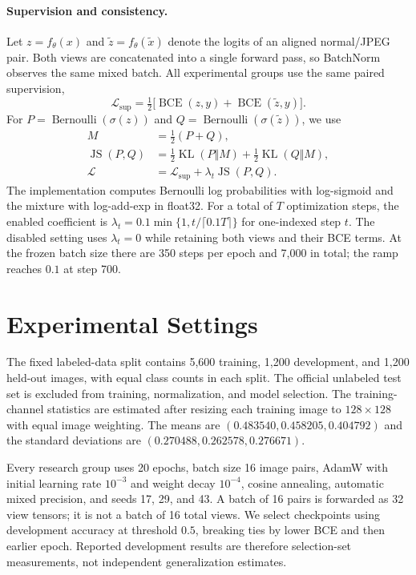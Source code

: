 \paragraph{Supervision and consistency.}
Let $z=f_\theta(x)$ and $\tilde z=f_\theta(\tilde x)$ denote the logits of an
aligned normal/JPEG pair. Both views are concatenated into a single forward
pass, so BatchNorm observes the same mixed batch. All experimental groups use
the same paired supervision,
\begin{equation}
 \mathcal L_{\mathrm{sup}}=\tfrac12\big[
 \operatorname{BCE}(z,y)+\operatorname{BCE}(\tilde z,y)\big].
\end{equation}
For $P=\operatorname{Bernoulli}(\sigma(z))$ and
$Q=\operatorname{Bernoulli}(\sigma(\tilde z))$, we use
\begin{align}
 M&=\tfrac12(P+Q),\\
 \operatorname{JS}(P,Q)&=\tfrac12\operatorname{KL}(P\Vert M)
                       +\tfrac12\operatorname{KL}(Q\Vert M),\\
 \mathcal L&=\mathcal L_{\mathrm{sup}}+\lambda_t\operatorname{JS}(P,Q).
\end{align}
The implementation computes Bernoulli log probabilities with log-sigmoid and
the mixture with log-add-exp in float32. For a total of $T$ optimization steps,
the enabled coefficient is
$\lambda_t=0.1\min\{1,t/\lceil0.1T\rceil\}$ for one-indexed step $t$.
The disabled setting uses $\lambda_t=0$ while retaining both views and their BCE
terms. At the frozen batch size there are 350 steps per epoch and 7,000 in total;
the ramp reaches $0.1$ at step 700.

\section{Experimental Settings}
\label{sec:settings}

The fixed labeled-data split contains 5,600 training, 1,200 development, and
1,200 held-out images, with equal class counts in each split. The official
unlabeled test set is excluded from training, normalization, and model
selection. The training-channel statistics are estimated after resizing each
training image to $128\times128$ with equal image weighting. The means are
$(0.483540,0.458205,0.404792)$ and the standard deviations are
$(0.270488,0.262578,0.276671)$.

Every research group uses 20 epochs, batch size 16 image pairs, AdamW with
initial learning rate $10^{-3}$ and weight decay $10^{-4}$, cosine annealing,
automatic mixed precision, and seeds 17, 29, and 43. A batch of 16 pairs is
forwarded as 32 view tensors; it is not a batch of 16 total views. We select
checkpoints using development accuracy at threshold $0.5$, breaking ties by
lower BCE and then earlier epoch. Reported development results are therefore
selection-set measurements, not independent generalization estimates.

